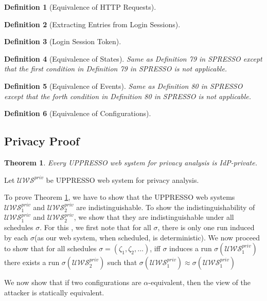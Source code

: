 \documentclass[letterpaper,onecolumn,10pt]{article}
\newtheorem{theorem}{Theorem}
\newtheorem{definition}{Definition}
\begin{document}
\begin{definition}[Equivalence of HTTP Requests]
\end{definition}

\begin{definition}[Extracting Entries from Login Sessions]
\end{definition}

\begin{definition}[Login Session Token]
\end{definition}

\begin{definition}[Equivalence of States]
  \label{def:C}
  Same as Definition 79 in SPRESSO except that the first condition in Definition 79 in SPRESSO is not applicable.
\end{definition}

\begin{definition}[Equivalence of Events]
  \label{def:Events}
  Same as Definition 80 in SPRESSO except that the forth condition in Definition 80 in SPRESSO is not applicable.
\end{definition}

\begin{definition}[Equivalence of Configurations]
\end{definition}

\subsection{Privacy Proof}

\begin{theorem} \label{theorem:A}Every UPPRESSO web system for privacy analysis is IdP-private.
\end{theorem}

Let $\mathcal{U\!W\!S}^{priv}$ be UPPRESSO web system for privacy analysis.\par
To prove Theorem \ref{theorem:A}, we have to show that the UPPRESSO web systems $\mathcal{U\!W\!S}^{priv}_1$ and $\mathcal{U\!W\!S}^{priv}_2$ 
are indistinguishable. To show the indistinguishability of $\mathcal{U\!W\!S}^{priv}_1$ and $\mathcal{U\!W\!S}^{priv}_2$, 
we show that they are indistinguishable under all schedules $\sigma$.
For this , we first note that for all $\sigma$, there is only one run induced by each $\sigma$(as our web system, when scheduled, is deterministic).
We now proceed to show that for all schedules $\sigma=(\zeta _1, \zeta_2,\dots)$, iff $\sigma$ induces a run $\sigma(\mathcal{U\!W\!S}^{priv}_1)$ there exists a run $\sigma(\mathcal{U\!W\!S}^{priv}_2)$ such that $\sigma(\mathcal{U\!W\!S}^{priv}_1)\approx\sigma(\mathcal{U\!W\!S}^{priv}_1)$\par
We now show that if two configurations are $\alpha$-equivalent, then the view of the attacker is statically equivalent.
\end{document}
